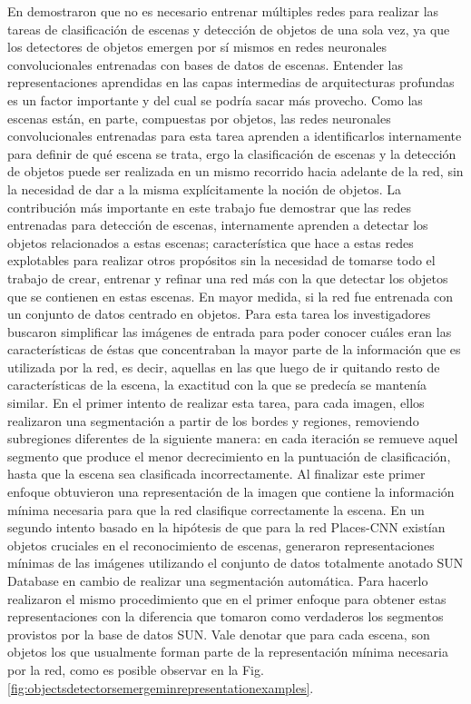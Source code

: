 En \cite{object_detectors_emerge_in_deep_scene_cnns} demostraron que no es necesario entrenar múltiples redes para realizar las tareas de clasificación de escenas y detección de objetos de una sola vez, ya que los detectores de objetos emergen por sí mismos en redes neuronales convolucionales entrenadas con bases de datos de escenas. 
Entender las representaciones aprendidas en las capas intermedias de arquitecturas profundas es un factor importante y del cual se podría sacar más provecho. Como las escenas están, en parte, compuestas por objetos, las redes neuronales convolucionales entrenadas para esta tarea aprenden a identificarlos internamente para definir de qué escena se trata, ergo la clasificación de escenas y la detección de objetos puede ser realizada en un mismo recorrido hacia adelante de la red, sin la necesidad de dar a la misma explícitamente la noción de objetos.
La contribución más importante en este trabajo fue demostrar que las redes entrenadas para detección de escenas, internamente aprenden a detectar los objetos relacionados a estas escenas; característica que hace a estas redes explotables para realizar otros propósitos sin la necesidad de tomarse todo el trabajo de crear, entrenar y refinar una red más con la que detectar los objetos que se contienen en estas escenas. En mayor medida, si la red fue entrenada con un conjunto de datos centrado en objetos. 
Para esta tarea los investigadores buscaron simplificar las imágenes de entrada para poder conocer cuáles eran las características de éstas que concentraban la mayor parte de la información que es utilizada por la red, es decir, aquellas en las que luego de ir quitando resto de características de la escena, la exactitud con la que se predecía se mantenía similar. En el primer intento de realizar esta tarea, para cada imagen, ellos realizaron una segmentación a partir de los bordes y regiones, removiendo subregiones diferentes de la siguiente manera: en cada iteración se remueve aquel segmento que produce el menor decrecimiento en la puntuación de clasificación, hasta que la escena sea clasificada incorrectamente. Al finalizar este primer enfoque obtuvieron una representación de la imagen que contiene la información mínima necesaria para que la red clasifique correctamente la escena. 
En un segundo intento basado en la hipótesis de que para la red Places-CNN existían objetos cruciales en el reconocimiento de escenas, generaron representaciones mínimas de las imágenes utilizando el conjunto de datos totalmente anotado SUN Database en cambio de realizar una segmentación automática. Para hacerlo realizaron el mismo procedimiento que en el primer enfoque para obtener estas representaciones con la diferencia que tomaron como verdaderos los segmentos provistos por la base de datos SUN. Vale denotar que para cada escena, son objetos los que usualmente forman parte de la representación mínima necesaria por la red, como es posible observar en la Fig. \ref{fig:objectsdetectorsemergeminrepresentationexamples}.
